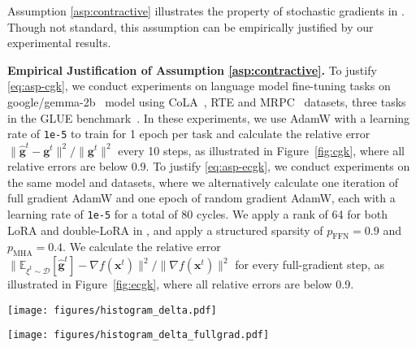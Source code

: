 Assumption \ref{asp:contractive} illustrates the property of stochastic gradients in \celora. Though not standard, this assumption can be empirically justified by our experimental results.

\textbf{Empirical Justification of Assumption \ref{asp:contractive}.} To justify \eqref{eq:asp-cgk}, we conduct experiments on language model fine-tuning tasks on google/gemma-2b~\cite{gemmamodelcard} model using CoLA~\cite{warstadt-etal-2019-neural}, RTE and MRPC~\cite{dolan-brockett-2005-automatically} datasets, three tasks in the GLUE benchmark~\cite{wang2019gluemultitaskbenchmarkanalysis}. In these experiments, we use AdamW with a learning rate of \texttt{1e-5} to train for 1 epoch per task and calculate the relative error $\|\hat{\mathbf{g}}^t-\mathbf{g}^t\|^2/\|\mathbf{g}^t\|^2$ every 10 steps, as illustrated in Figure~\ref{fig:cgk}, where all relative errors are below 0.9. To justify \eqref{eq:asp-ecgk}, we conduct experiments on the same model and datasets, where we alternatively calculate one iteration of full gradient AdamW and one epoch of random gradient AdamW, each with a learning rate of \texttt{1e-5} for a total of 80 cycles. We apply a rank of 64 for both LoRA and double-LoRA in \celora, and apply a structured sparsity of $p_{\mathrm{FFN}}=0.9$ and $p_{\mathrm{MHA}}=0.4$. We calculate the relative error $\|\mathbb{E}_{\xi^t\sim\mathcal{D}}[\hat{\mathbf{g}}^t]-\nabla f(\mathbf{x}^t)\|^2/\|\nabla f(\mathbf{x}^t)\|^2$ for every full-gradient step, as illustrated in Figure~\ref{fig:ecgk}, where all relative errors are below 0.9. 


\begin{figure*}[ht]
    \centering
        \texttt{[image: figures/histogram\_delta.pdf]}
    \vspace{-4mm}
    \caption{Empirical validation of \eqref{eq:asp-cgk} on MRPC (left), RTE (middle) and CoLA (right).}
    \label{fig:cgk}
\end{figure*}

\begin{figure*}[ht]
    \centering
        \texttt{[image: figures/histogram\_delta\_fullgrad.pdf]}
    \vspace{-4mm}
    \caption{Empirical validation of \eqref{eq:asp-ecgk} on MRPC (left), RTE (middle) and CoLA (right).}
    \label{fig:ecgk}
\end{figure*}


